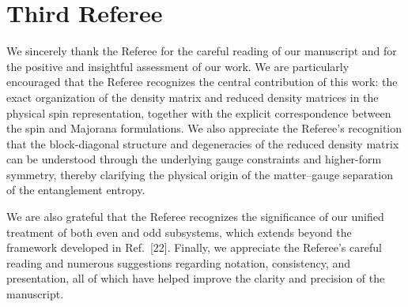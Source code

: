 \documentclass[12pt]{article}
\begin{document}


\section*{Third Referee}

We sincerely thank the Referee for the careful reading of our manuscript and for the positive and insightful assessment of our work. We are particularly encouraged that the Referee recognizes the central contribution of this work: the exact organization of the density matrix and reduced density matrices in the physical spin representation, together with the explicit correspondence between the spin and Majorana formulations. We also appreciate the Referee's recognition that the block-diagonal structure and degeneracies of the reduced density matrix can be understood through the underlying gauge constraints and higher-form symmetry, thereby clarifying the physical origin of the matter--gauge separation of the entanglement entropy.

We are also grateful that the Referee recognizes the significance of our unified treatment of both even and odd subsystems, which extends beyond the framework developed in Ref.~[22]. Finally, we appreciate the Referee's careful reading and numerous suggestions regarding notation, consistency, and presentation, all of which have helped improve the clarity and precision of the manuscript.
\end{document}
